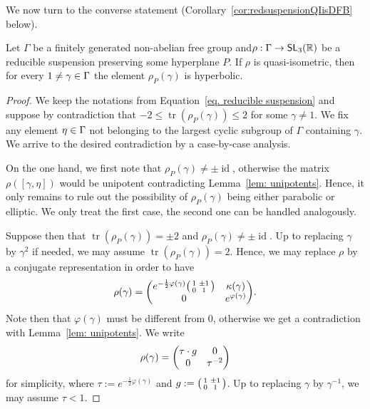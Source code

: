 \documentclass[AHL,Unicode,longabstracts]{cedram}
\DeclareMathOperator{\SL}{\mathsf{SL}}
\DeclareMathOperator{\idd}{id}
\DeclareMathOperator{\tr}{tr}
\newcommand{\R}{\mathbb{R}}
\renewcommand*{\to}{\mathchoice{\longrightarrow}{\rightarrow}{\rightarrow}{\rightarrow}}
\let\originalleft\left
\let\originalright\right
\renewcommand{\left}{\mathopen{}\mathclose\bgroup\originalleft}
\renewcommand{\right}{\aftergroup\egroup\originalright}
\let\oldin\in
\renewcommand{\in}{\mathchoice{\oldin}{\oldin}{\,\oldin\,}{\,\oldin\,}}
\begin{document}
We now turn to the converse statement (Corollary~\ref{cor:redsuspensionQIisDFB} below).



\begin{lemm}\label{lem: restriction to plane purely hyperbolic}
Let $\Gamma$ be a finitely generated non-abelian free group and\linebreak $\rho:\Gamma \to \SL_3(\R)$ be a reducible suspension preserving some hyperplane $P$. If $\rho$ is quasi-isometric, then for every $1\neq \gamma\in\Gamma$ the element $\rho_P(\gamma)$ is hyperbolic.
\end{lemm}



\begin{proof}
We keep the notations from Equation~\eqref{eq. reducible suspension} and suppose by contradiction that $-2\leq \tr(\rho_P(\gamma))\leq 2$ for some $\gamma\neq 1$.
We fix any element $\eta\in\Gamma$ not belonging to the largest cyclic subgroup of $\Gamma$ containing $\gamma$. We arrive to the desired contradiction by a case-by-case analysis.

On the one hand, we first note that $\rho_P(\gamma)\neq\pm\idd $, otherwise the matrix $\rho([\gamma,\eta])$ would be unipotent contradicting Lemma~\ref{lem: unipotents}. Hence, it only remains to rule out the possibility of $\rho_P(\gamma)$ being either parabolic or elliptic. We only treat the first case, the second one can be handled analogously.

Suppose then that $\tr(\rho_P(\gamma))=\pm 2$ and $\rho_P(\gamma)\neq \pm \idd$. Up to replacing $\gamma$ by $\gamma^2$ if needed, we may assume $\tr(\rho_P(\gamma))= 2$.
Hence, we may replace $\rho$ by a conjugate representation in order to have
\[
\rho(\gamma)=\left(
\begin{matrix}
e^{-\frac{1}{2}\varphi(\gamma)} \left(
\begin{smallmatrix}
1 & \pm 1\\
0 & 1
\end{smallmatrix}\right) & \kappa(\gamma)\\
0 & e^{\varphi(\gamma)}
\end{matrix} \right).
\]
Note then that $\varphi(\gamma)$ must be different from $0$, otherwise we get a contradiction with Lemma~\ref{lem: unipotents}.
We write
\[
\rho(\gamma)=\left(
\begin{matrix}
\tau \cdot g & 0\\
0 & \tau^{-2}
\end{matrix} \right)
\]
for simplicity, where $\tau:=e^{-\frac{1}{2}\varphi(\gamma)}$ and $g:= \left(
\begin{smallmatrix}
1 & \pm 1\\
0 & 1
\end{smallmatrix}\right)$. Up to replacing $\gamma$ by $\gamma^{-1}$, we may assume $\tau <1$.


\end{proof}
\end{document}
